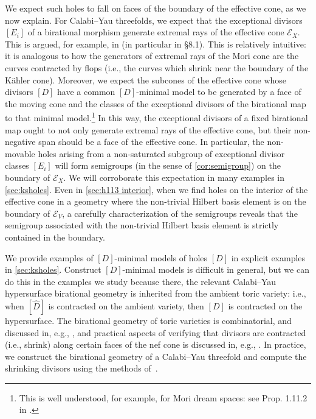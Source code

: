 \documentclass[11pt,dvipsnames]{article}
\theoremstyle{definition}
\begin{document}
We expect such holes to fall on faces of the boundary of the effective cone, as we now explain. For Calabi--Yau threefolds, we expect that the exceptional divisors $[E_i]$ of a birational morphism generate extremal rays of the effective cone $\mathcal{E}_X$. This is argued, for example, in \cite{Alim:2021vhs} (in particular in \S8.1). This is relatively intuitive: it is analogous to how the generators of extremal rays of the Mori cone are the curves contracted by flops (i.e., the curves which shrink near the boundary of the K\"ahler cone). Moreover, we expect the subcones of the effective cone whose divisors $[D]$ have a common $[D]$-minimal model to be generated by a face of the moving cone and the classes of the exceptional divisors of the birational map to that minimal model.\footnote{This is well understood, for example, for Mori dream spaces: see Prop. 1.11.2 in \cite{hu2000mori}.} In this way, the exceptional divisors of a fixed birational map ought to not only generate extremal rays of the effective cone, but their non-negative span should be a face of the effective cone. In particular, the non-movable holes arising from a non-saturated subgroup of exceptional divisor classes $[E_i]$ will form semigroups (in the sense of \cref{cor:semigroup}) on the boundary of $\mathcal{E}_X$. We will corroborate this expectation in many examples in \cref{sec:ksholes}. Even in \cref{sec:h113 interior}, when we find holes on the interior of the effective cone in a geometry where the non-trivial Hilbert basis element is on the boundary of $\mathcal{E}_V$, a carefully characterization of the semigroups reveals that the semigroup associated with the non-trivial Hilbert basis element is strictly contained in the boundary.

We provide examples of $[D]$-minimal models of holes $[D]$ in explicit examples in \cref{sec:ksholes}. Construct $[D]$-minimal models is difficult in general, but we can do this in the examples we study because there, the relevant Calabi--Yau hypersurface birational geometry is inherited from the ambient toric variety: i.e., when $[\hat{D}]$ is contracted on the ambient variety, then $[D]$ is contracted on the hypersurface. The birational geometry of toric varieties is combinatorial, and discussed in, e.g., \cite{cls, MacFadden:2025ssx}, and practical aspects of verifying that divisors are contracted (i.e., shrink) along certain faces of the nef cone is discussed in, e.g., \cite{Jain:2025vfh}. In practice, we construct the birational geometry of a Calabi--Yau threefold and compute the shrinking divisors using the methods of~\cite{Gendler:2022ztv}.
\end{document}
